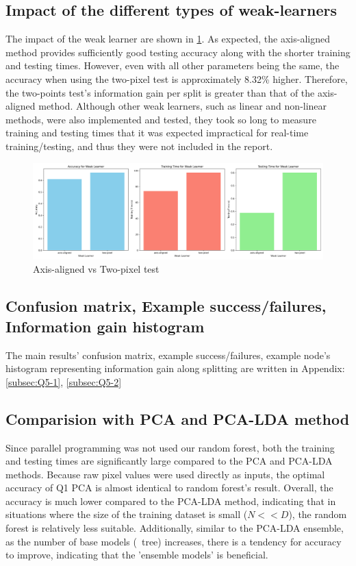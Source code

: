 \subsection{Impact of the different types of weak-learners}
The impact of the weak learner are shown in \cref{fig:q5-fig7}. As expected, the axis-aligned method provides sufficiently good testing accuracy along with the shorter training and testing times. However, even with all other parameters being the same, the accuracy when using the two-pixel test is approximately 8.32\% higher. Therefore, the two-points test's information gain per split is greater than that of the axis-aligned method. Although other weak learners, such as linear and non-linear methods, were also implemented and tested, they took so long to measure training and testing times that it was expected impractical for real-time training/testing, and thus they were not included in the report.
\begin{figure}[t]
	\centering
	\includegraphics[width=0.8\linewidth]{image/q5-fig7.png}
	
	\caption{Axis-aligned vs Two-pixel test}
	\label{fig:q5-fig7}
\end{figure}


\subsection{Confusion matrix, Example success/failures, Information gain histogram}
The main results' confusion matrix, example success/failures, example node's histogram representing information gain along splitting are written in Appendix: \ref{subsec:Q5-1}, \ref{subsec:Q5-2}

\subsection{Comparision with PCA and PCA-LDA method}
Since parallel programming was not used our random forest, both the training and testing times are significantly large compared to the PCA and PCA-LDA methods. Because raw pixel values were used directly as inputs, the optimal accuracy of Q1 PCA is almost identical to random forest's result. Overall, the accuracy is much lower compared to the PCA-LDA method, indicating that in situations where the size of the training dataset is small ($N << D$), the random forest is relatively less suitable. Additionally, similar to the PCA-LDA ensemble, as the number of base models (~tree) increases, there is a tendency for accuracy to improve, indicating that the 'ensemble models' is beneficial.

